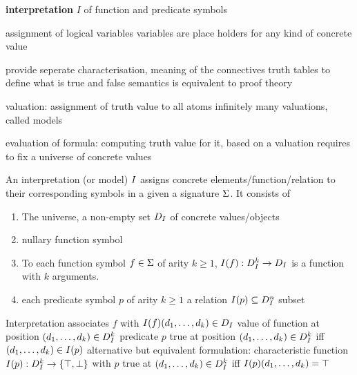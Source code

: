             \textbf{interpretation} $I$ of function and predicate symbols

            assignment of logical variables
            variables are place holders for any kind of concrete value

            provide seperate characterisation, meaning of the connectives
            truth tables
            to define what is true and false
            semantics is equivalent to proof theory

            valuation: assignment of truth value to all atoms
            infinitely many valuations, called models

            evaluation of formula: computing truth value for it, based on a valuation
            requires to fix a universe of concrete values

            \begin{definition}[Interpretation]
                An interpretation (or model) $I$ assigns concrete elements/function/relation to their corresponding symbols in a given a signature $\Sigma$. It consists of
                \begin{enumerate}
                    \item The universe, a non-empty set $D_{I}$ of concrete values/objects
                    \item nullary function symbol
                    \item To each function symbol $f\in\Sigma$ of arity $k\geq 1$, $I(f):D_{I}^k\rightarrow D_{I}$ is a function with $k$ arguments.
                    \item each predicate symbol $p$ of arity $k\geq 1$ a relation $I(p)\subseteq D_{I}^n$ subset
                \end{enumerate}

            \end{definition}

            Interpretation associates $f$ with $I(f)(d_1,\ldots,d_k)\in D_{I}$ value of function at position $(d_1,\ldots,d_k)\in D_{I}^k $
            predicate $p$ true at position $(d_1,\ldots,d_k)\in D_{I}^k$ iff $(d_1,\ldots,d_k)\in I(p)$
            alternative but equivalent formulation: characteristic function $I(p):D_{I}^k\rightarrow\{\top,\bot\}$ with $p$ true at $(d_1,\ldots,d_k)\in D_{I}^k$ iff $I(p)(d_1,\ldots,d_k)=\top$

